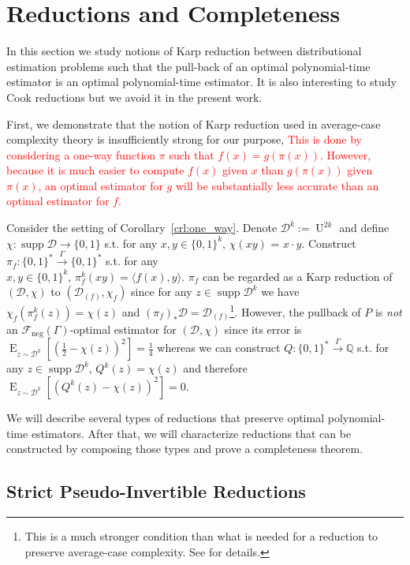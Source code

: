 \documentclass[11pt]{article}
\numberwithin{equation}{section}
\theoremstyle{definition}
\theoremstyle{plain}
\newcommand{\Bool}{\{0,1\}}
\newcommand{\Words}{{\Bool^*}}
\DeclareMathOperator{\Supp}{supp}
\DeclareMathOperator{\E}{E}
\DeclareMathOperator{\Un}{U}
\newcommand{\Rats}{\mathbb{Q}}
\newcommand{\Chev}[1]{\langle #1 \rangle}
\newcommand{\Dist}{\mathcal{D}}
\newcommand{\Fall}{\mathcal{F}}
\newcommand{\Scheme}{\xrightarrow{\Gamma}}
\begin{document}
\section{Reductions and Completeness}
\label{sec:reductions}

In this section we study notions of Karp reduction between distributional estimation problems such that the pull-back of an optimal polynomial-time estimator is an optimal polynomial-time estimator. It is also interesting to study Cook reductions but we avoid it in the present work.

First, we demonstrate that the notion of Karp reduction used in average-case complexity theory is insufficiently strong for our purpose, \textcolor{red}{This is done by considering a one-way function $\pi$ such that $f(x)=g(\pi(x))$. However, because it is much easier to compute $f(x)$ given $x$ than $g(\pi(x))$ given $\pi(x)$, an optimal estimator for $g$ will be substantially less accurate than an optimal estimator for $f$.} 

Consider the setting of Corollary~\ref{crl:one_way}. Denote $\Dist^k:=\Un^{2k}$ and define ${\chi: \Supp \Dist \rightarrow \Bool}$ s.t. for any $x,y \in \Bool^k$, $\chi(xy)$ = $x \cdot y$. Construct $\pi_f: \Words \Scheme \Words$ s.t. for any\\ $x,y \in \Bool^k$, ${\pi_f^k(xy) = \Chev{f(x),y}}$. $\pi_f$ can be regarded as a Karp reduction of $(\Dist, \chi)$ to $(\Dist_{(f)},\chi_f)$ since for any ${z \in \Supp \Dist^k}$ we have $\chi_f(\pi_f^k(z))=\chi(z)$ and $(\pi_f)_*\Dist=\Dist_{(f)}$\footnote{This is a much stronger condition than what is needed for a reduction to preserve average-case complexity. See \cite{Bogdanov_2006} for details.}. However, the pullback of $P$ is \emph{not} an $\Fall_{\text{neg}}(\Gamma)$-optimal estimator for $(\Dist,\chi)$ since its error is $\E_{z \sim \Dist^k}[(\frac{1}{2}-\chi(z))^2]=\frac{1}{4}$ whereas we can construct $Q: \Words \Scheme \Rats$ s.t. for any $z \in \Supp \Dist^k$, $Q^k(z)=\chi(z)$ and therefore $\E_{z \sim \Dist^k}[(Q^k(z)-\chi(z))^2]=0$.

We will describe several types of reductions that preserve optimal polynomial-time estimators. After that, we will characterize reductions that can be constructed by composing those types and prove a completeness theorem.

\subsection{Strict Pseudo-Invertible Reductions}
\end{document}
